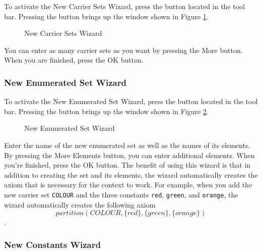 To activate the \textsf{New Carrier Sets Wizard}, press the  button located in the tool bar. Pressing the button brings up the window shown in Figure \ref{fig_ref_01_eventb_editor4}.

\begin{figure}[!ht]
\begin{center}
	\caption{New Carrier Sets Wizard}
	\label{fig_ref_01_eventb_editor4}
\end{center}
\end{figure}

You can enter as many carrier sets as you want by pressing the \textsf{More} button. When you are finished, press the \textsf{OK} button. 

\subsubsection{New Enumerated Set Wizard}
\label{enumerated_set_wizard}

To activate the \textsf{New Enumerated Set Wizard}, press the  button located in the tool bar. Pressing the button brings up the window shown in Figure \ref{fig_ref_01_eventb_editor5}.

\begin{figure}[!ht]
\begin{center}
	\caption{New Enumerated Set Wizard}
	\label{fig_ref_01_eventb_editor5}
\end{center}
\end{figure}

Enter the name of the new enumerated set as well as the names of its elements. By pressing the \textsf{More Elements} button, you can enter additional elements. When you're finished, press the \textsf{OK} button. The benefit of using this wizard is that in addition to creating the set and its elements, the wizard automatically creates the axiom that is necessary for the context to work. For example, when you add the new carrier set \texttt{COLOUR} and the three constants \texttt{red}, \texttt{green}, and \texttt{orange}, the wizard automatically creates the following axiom 
\[partition(COLOUR , \{red\}, \{green\}, \{orange\})\].

\subsubsection{New Constants Wizard}

